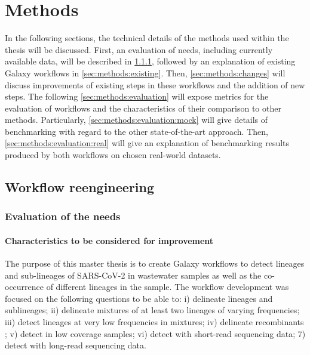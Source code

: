 %
\section{Methods} \label{sec:methods}
In the following sections, the technical details of the methods used within the thesis will be discussed. First, an evaluation of needs, including currently available data, will be described in \cref{sec:methods:needs}, followed by an explanation of existing Galaxy workflows in \cref{sec:methods:existing}. Then, \cref{sec:methods:changes} will discuss improvements of existing steps in these workflows and the addition of new steps. The following \cref{sec:methods:evaluation} will expose metrics for the evaluation of workflows and the characteristics of their comparison to other methods. Particularly, \cref{sec:methods:evaluation:mock} will give details of benchmarking with regard to the other state-of-the-art approach. Then, \cref{sec:methods:evaluation:real} will give an explanation of benchmarking results produced by both workflows on chosen real-world datasets.

    \subsection{Workflow reengineering} 
        \subsubsection{Evaluation of the needs} \label{sec:methods:needs}
            \paragraph{Characteristics to be considered for improvement}
            The purpose of this master thesis is to create Galaxy workflows to detect lineages and sub-lineages of SARS-CoV-2 in wastewater samples as well as the co-occurrence of different lineages in the sample. The workflow development was focused on the following questions to be able to: i) delineate lineages and sublineages; ii) delineate mixtures of at least two lineages of varying frequencies; iii) detect lineages at very low frequencies in mixtures; iv) delineate recombinants \cite{simonloriere2011}; v) detect in low coverage samples; vi) detect with short-read sequencing data; 7) detect with long-read sequencing data.
            
